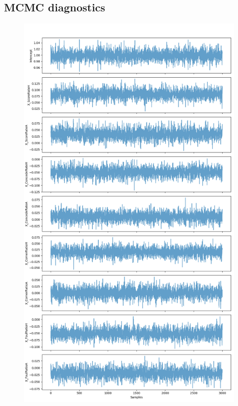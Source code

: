 \documentclass[9pt]{IEEEtran}
\begin{document}
\subsection{MCMC diagnostics}

\begin{figure}[h]
\centering
\includegraphics[width=1\columnwidth]{figures/trace.png}
\caption{}
\label{fig:trace}
\end{figure}
\end{document}

